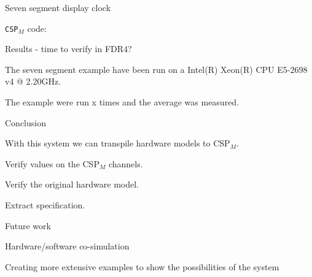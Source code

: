 \documentclass[13pt]{beamer}
\newcommand{\cspm}{CSP$_M$}
\begin{document}
%
\begin{frame}{Seven segment display clock}
 \begin{block}{}
  \texttt{\cspm{}} code:
    \vspace{3mm}

     \scalebox{0.7}{\usebox{\cspmexample}}
 \end{block}
\end{frame}
%
\begin{frame}{Results - time to verify in FDR4?}
 \begin{block}{}
     The seven segment example have been run on a Intel(R) Xeon(R) CPU E5-2698 v4 @ 2.20GHz.

     \vspace{5mm}

   The example were run x times and the average was measured.
 \end{block}
\end{frame}
%
\begin{frame}{Conclusion}
 \begin{block}{}
  With this system we can transpile hardware models to \cspm{}.
 \end{block}

 \pause

 \begin{block}{}
  Verify values on the \cspm{} channels.
 \end{block}

 \pause

 \begin{block}{}
  Verify the original hardware model.
 \end{block}

 \pause

 \begin{block}{}
  Extract specification.
 \end{block}

\end{frame}
%
\begin{frame}{Future work}
 \begin{block}{}
     Hardware/software co-simulation
 \end{block}

 \pause

 \begin{block}{}
     Creating more extensive examples to show the possibilities of the system
 \end{block}

\end{frame}
\end{document}
